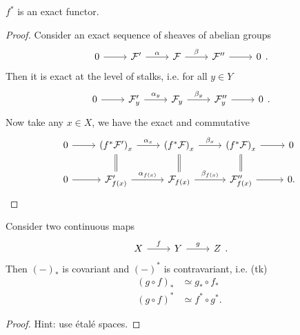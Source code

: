 \documentclass[../Main]{subfiles}
\begin{document}
\begin{cor}
	$f^*$ is an exact functor.
\end{cor} 
\begin{proof}
	Consider an exact sequence of sheaves of abelian groups
	\begin{equation}
	\begin{tikzcd}
		0 \arrow[r, "", rightarrow] &
		\mathcal{F}' \arrow[r, "\alpha", rightarrow] &
		\mathcal{F} \arrow[r, "\beta", rightarrow] &
		\mathcal{F}'' \arrow[r, "", rightarrow] &
		0
	\end{tikzcd}
	.\end{equation} 
	Then it is exact at the level of stalks, i.e. for all $y \in Y$
	\begin{equation}
	\begin{tikzcd}
		0 \arrow[r, "", rightarrow] &
		\mathcal{F}_y' \arrow[r, "\alpha_y", rightarrow] &
		\mathcal{F}_y \arrow[r, "\beta_y", rightarrow] &
		\mathcal{F}_y'' \arrow[r, "", rightarrow] &
		0
	\end{tikzcd}
	.\end{equation} 
	Now take any $x \in X$, we have the exact and commutative
	\begin{equation}
	\begin{tikzcd}
		0 \arrow[r, "", rightarrow]  &
		\left( f^* \mathcal{F}' \right)_x \arrow[r, "\alpha_x", rightarrow] \arrow[d, "", equals] &
		\left( f^* \mathcal{F} \right)_x \arrow[r, "\beta_x", rightarrow] \arrow[d, "", equals]  &
		\left( f^* \mathcal{F} \right)_x \arrow[r, "", rightarrow] \arrow[d, "", equals]  &
		0 \\
		0 \arrow[r, "", rightarrow] &
		\mathcal{F}_{f(x)}' \arrow[r, "\alpha_{f(x)}", rightarrow] &
		\mathcal{F}_{f(x)} \arrow[r, "\beta_{f(x)}", rightarrow] &
		\mathcal{F}_{f(x)}'' \arrow[r, "", rightarrow] &
		0.
	\end{tikzcd}\qedhere
	\end{equation} 
\end{proof}

\begin{prop}[]
	Consider two continuous maps
	\begin{equation}
	\begin{tikzcd}
		X \arrow[r, "f", rightarrow] &
		Y \arrow[r, "g", rightarrow] &
		Z
	\end{tikzcd}
	.\end{equation} 
	Then $(-)_*$ is covariant and $(-)^*$ is contravariant, i.e. (tk)
	\begin{align}
		\left( g \circ f \right)_* &\simeq g_* \circ f_* \\
		\left( g \circ f \right)^* &\simeq f^* \circ g^*
	.\end{align} 
\end{prop}
\begin{proof}
	Hint: use étalé spaces.
\end{proof}
\end{document}
